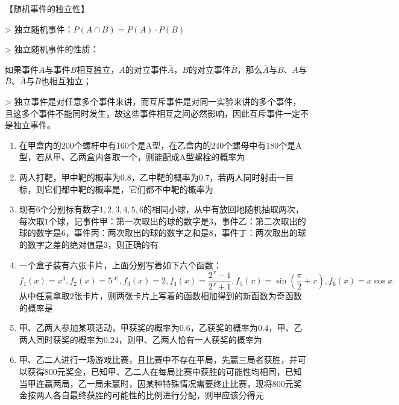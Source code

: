 【随机事件的独立性】

> 独立随机事件：$P(A\cap B)=P(A)\cdot P(B)$

> 独立随机事件的性质：

如果事件$A$与事件$B$相互独立，$A$的对立事件$\bar{A}$，$B$的对立事件$\bar{B}$，那么$\bar{A}$与$B$、$A$与$\bar{B}$、$\bar{A}$与$\bar{B}$也相互独立；

> 独立事件是对任意多个事件来讲，而互斥事件是对同一实验来讲的多个事件，且这多个事件不能同时发生，故这些事件相互之间必然影响，因此互斥事件一定不是独立事件。

\begin{enumerate}

\item 在甲盒内的$200$个螺杆中有$160$个是A型，在乙盒内的$240$个螺母中有$180$个是A型，若从甲、乙两盒内各取一个，则能配成A型螺栓的概率为

\item 两人打靶，甲中靶的概率为$0.8$，乙中靶的概率为$0.7$，若两人同时射击一目标，则它们都中靶的概率是，它们都不中靶的概率为

\item 现有$6$个分别标有数字$1,2,3,4,5,6$的相同小球，从中有放回地随机抽取两次，每次取$1$个球，记事件甲：第一次取出的球的数字是$3$，事件乙：第二次取出的球的数字是$6$，事件丙：两次取出的球的数字之和是$8$，事件丁：两次取出的球的数字之差的绝对值是$3$，则正确的有



\item 一个盒子装有六张卡片，上面分别写着如下六个函数：$f_{1}(x)=x^{3},f_{2}(x)=5^{|x|},f_{3}(x)=2,f_{4}(x)=\dfrac{2^{x}-1}{2^{x}+1},f_{5}(x)=\sin(\dfrac{\pi}{2}+x),f_{6}(x)=x \cos x.$ 从中任意拿取$2$张卡片，则两张卡片上写着的函数相加得到的新函数为奇函数的概率是

\item 甲、乙两人参加某项活动，甲获奖的概率为$0.6$，乙获奖的概率为$0.4$，甲、乙两人同时获奖的概率为$0.24$，则甲、乙两人恰有一人获奖的概率为

\item 甲、乙二人进行一场游戏比赛，且比赛中不存在平局，先赢三局者获胜，并可以获得$800$元奖金，已知甲、乙二人在每局比赛中获胜的可能性均相同，已知当甲连赢两局，乙一局未赢时，因某种特殊情况需要终止比赛，现将$800$元奖金按两人各自最终获胜的可能性的比例进行分配，则甲应该分得元


\end{enumerate}
